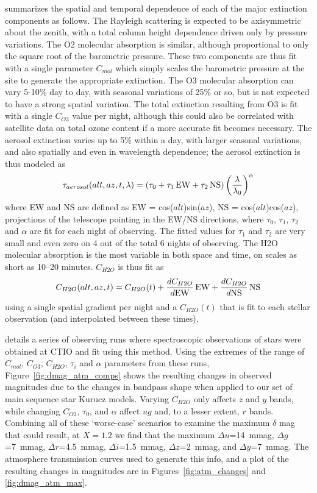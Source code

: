 \documentclass[12pt,preprint]{aastex}
\begin{document}
\citet{Stubbs2007b} summarizes the spatial and temporal dependence of
each of the major extinction components as follows.  The Rayleigh
scattering is expected to be axisymmetric about the zenith, with a
total column height dependence driven only by pressure variations. The
O2 molecular absorption is similar, although proportional to only the
square root of the barometric pressure. These two components are thus
fit with a single parameter $C_{mol}$ which simply scales the
barometric pressure at the site to generate the appropriate
extinction. The O3 molecular absorption can vary 5-10\% day to day,
with seasonal variations of 25\% or so, but is not expected to have a
strong spatial variation. The total extinction resulting from O3 is
fit with a single $C_{O3}$ value per night, although this could also
be correlated with satellite data on total ozone content if a more
accurate fit becomes necessary. The aerosol extinction varies up to
5\% within a day, with larger seasonal variations, and also spatially
and even in wavelength dependence; the aerosol extinction is thus
modeled as
\begin{equation}
\label{eqn:tau_aerosol}
\tau_{aerosol}(alt,az,t,\lambda) = (\tau_0 + \tau_1\,{\rm EW} +
\tau_2\,{\rm NS}) \left({\lambda \over \lambda_0}\right)^{\alpha}
\end{equation}
where EW and NS are defined as EW = cos($alt$)sin($az$), NS =
cos($alt$)cos($az$), projections of the telescope pointing in the
EW/NS directions, where $\tau_0$, $\tau_1$, $\tau_2$ and $\alpha$ are
fit for each night of observing. The fitted values for $\tau_1$ and
$\tau_2$ are very small and even zero on 4 out of the total 6 nights
of observing. The H2O molecular absorption is the most variable in
both space and time, on scales as short as 10--20 minutes.  $C_{H2O}$
is thus fit as
\begin{equation}
\label{eqn:coeff_h2o}
C_{H2O}(alt,az,t) = C_{H2O}(t) + {dC_{H2O} \over d{\rm EW}}\,{\rm EW} +
{dC_{H2O} \over d{\rm NS}}\,{\rm NS}
\end{equation}
using a single spatial gradient per night and a $C_{H2O}(t)$ that 
is fit to each stellar observation (and interpolated between these 
times). 

\citet{Burke2010b} details a series of observing runs where
spectroscopic observations of stars were obtained at CTIO and fit
using this method. Using the extremes of the range of $C_{mol}$,
$C_{O3}$, $C_{H2O}$, $\tau_i$ and $\alpha$ parameters from these runs,
Figure~\ref{fig:dmag_atm_comps} shows the resulting changes in
observed magnitudes due to the changes in bandpass shape when applied
to our set of main sequence star Kurucz models. Varying
$C_{H2O}$ only affects $z$ and $y$ bands, while changing $C_{O3}$,
$\tau_0$, and $\alpha$ affect $ug$ and, to a lesser extent, $r$
bands. Combining all of these `worse-case' scenarios to examine the
maximum $\delta$ mag that could result, at $X=1.2$ we find that the
maximum $\Delta u$=14~mmag, $\Delta g$=7~mmag, $\Delta r$=4.5~mmag,
$\Delta i$=1.5~mmag, $\Delta z$=2~mmag, and $\Delta y$=7~mmag. The 
atmosphere transmission curves used to generate this info, and a plot
of the resulting changes in magnitudes are in Figures~\ref{fig:atm_changes}
and \ref{fig:dmag_atm_max}. 
\end{document}
